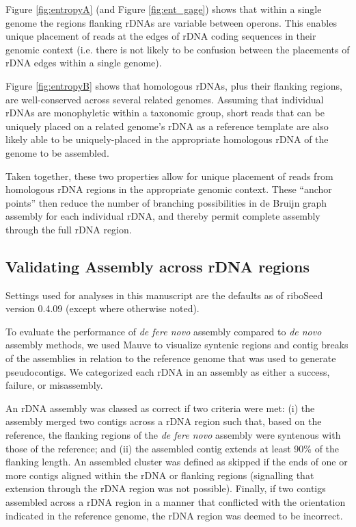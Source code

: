 \documentclass[10pt]{article}
\begin{document}
\begin{linenumbers}
Figure \ref{fig:entropyA} (and Figure \ref{fig:ent_gage}) shows that within a single genome the regions flanking rDNAs are variable between operons. This enables unique placement of reads at the edges of rDNA coding sequences in their genomic context (i.e. there is not likely to be confusion between the placements of rDNA edges within a single genome).


Figure \ref{fig:entropyB} shows that homologous rDNAs, plus their flanking regions, are well-conserved across several related genomes. Assuming that individual rDNAs are monophyletic within a taxonomic group, short reads that can be uniquely placed on a related genome's rDNA as a reference template are also likely able to be uniquely-placed in the appropriate homologous rDNA of the genome to be assembled.


Taken together, these two properties allow for unique placement of reads from homologous rDNA regions in the appropriate genomic context. These ``anchor points'' then reduce the number of branching possibilities in de Bruijn graph assembly for each individual rDNA, and thereby permit complete assembly through the full rDNA region.


\subsection*{Validating Assembly across rDNA regions}

Settings used for analyses in this manuscript are the defaults as of riboSeed version 0.4.09 (except where otherwise noted).


To evaluate the performance of \textit{de fere novo} assembly compared to \textit{de novo} assembly methods, we used Mauve to visualize syntenic regions and contig breaks of the assemblies in relation to the reference genome that was used to generate pseudocontigs. We categorized each rDNA in an assembly as either a success, failure, or misassembly.

An rDNA assembly was classed as correct if two criteria were met: (i) the assembly merged two contigs across a rDNA region such that, based on the reference, the flanking regions of the \textit{de fere novo} assembly were syntenous with those of the reference; and (ii) the assembled contig extends at least 90\% of the flanking length. An assembled cluster was defined as skipped if the ends of one or more contigs aligned within the rDNA or flanking regions (signalling that extension through the rDNA region was not possible). Finally, if two contigs assembled across a rDNA region in a manner that conflicted with the orientation indicated in the reference genome, the rDNA region was deemed to be incorrect.


\end{linenumbers}
\end{document}
